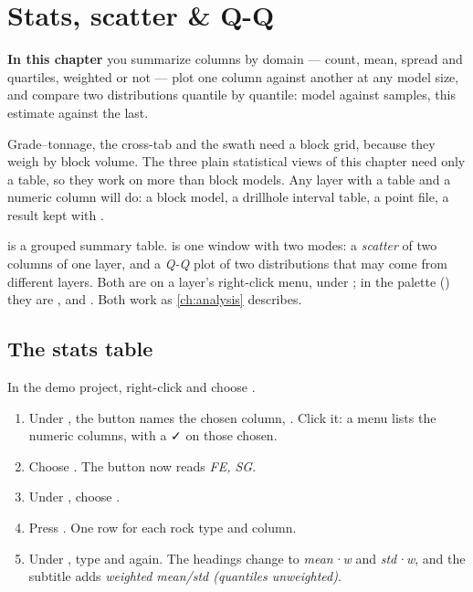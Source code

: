 \chapter{Stats, scatter \& Q-Q}\label{ch:stats}
\begin{goals}
\textbf{In this chapter} you summarize columns by domain — count, mean, spread and quartiles, weighted or not — plot one column against another at any model size, and compare two distributions quantile by quantile: model against samples, this estimate against the last.
\end{goals}

Grade–tonnage, the cross-tab and the swath need a block grid, because they weigh by block volume. The three plain statistical views of this chapter need only a table, so they work on more than block models. Any layer with a table and a numeric column will do: a block model, a drillhole interval table, a point file, a result kept with .

 is a grouped summary table.  is one window with two modes: a \emph{scatter} of two columns of one layer, and a \emph{Q-Q} plot of two distributions that may come from different layers. Both are on a layer's right-click menu, under ; in the palette () they are ,  and . Both work as \cref{ch:analysis} describes.

\section{The stats table}\label{sec:stats-table}
\begin{tryit}
In the demo project, right-click  and choose .
\begin{enumerate}
\item Under , the button names the chosen column, . Click it: a menu lists the numeric columns, with a ✓ on those chosen.
\item Choose . The button now reads \emph{FE, SG}.
\item Under , choose .
\item Press . One row for each rock type and column.
\item Under , type  and  again. The headings change to \emph{mean·w} and \emph{std·w}, and the subtitle adds \emph{weighted mean/std (quantiles unweighted)}.
\end{enumerate}
\end{tryit}

